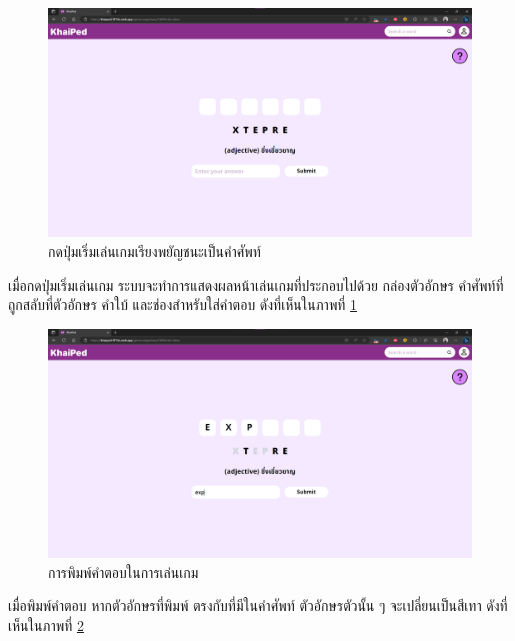 \documentclass[12pt,oneside,openright,a4paper]{cpe-thai-project}
\begin{document}
\pagebreak
\begin{figure}[!h]\centering
	\includegraphics[width=\textwidth, keepaspectratio=true]{image/chap4/UI/game/start.png}
	\caption{{กดปุ่มเริ่มเล่นเกมเรียงพยัญชนะเป็นคำศัพท์}}\label{fig:chap4UIGameStart}
\end{figure}
\hspace{1cm}
เมื่อกดปุ่มเริ่มเล่นเกม ระบบจะทำการแสดงผลหน้าเล่นเกมที่ประกอบไปด้วย กล่องตัวอักษร คำศัพท์ที่ถูกสลับที่ตัวอักษร
คำใบ้ และช่องสำหรับใส่คำตอบ ดังที่เห็นในภาพที่ \ref{fig:chap4UIGameStart}

\begin{figure}[!h]\centering
	\includegraphics[width=\textwidth, keepaspectratio=true]{image/chap4/UI/game/type.png}
	\caption{{การพิมพ์คำตอบในการเล่นเกม}}\label{fig:chap4UIGameType}
\end{figure}
\hspace{1cm}
เมื่อพิมพ์คำตอบ หากตัวอักษรที่พิมพ์ ตรงกับที่มีในคำศัพท์ ตัวอักษรตัวนั้น ๆ จะเปลี่ยนเป็นสีเทา
ดังที่เห็นในภาพที่ \ref{fig:chap4UIGameType}
\end{document}
